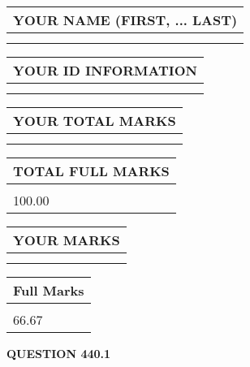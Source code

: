 \documentclass{ctexart}
\begin{document}
   
   
   
\newpage 
\setcounter{page}{ 
   440001 } 
   
   
   
   
\noindent\begin{tabular}{|l|}
\hline
YOUR NAME (FIRST, ... LAST)  \\
\hline
 \\ 
 \\ 
\hline
\end{tabular}
\hspace{0.05in} \begin{tabular}{|l|}
\hline
 YOUR   ID   INFORMATION  \\
\hline
 \\ 
 \\ 
\hline
\end{tabular}
   
   
\vspace{0.2in}\noindent\begin{tabular}{|l|}
\hline
YOUR TOTAL MARKS  \\
\hline
 \\ 
 \\ 
\hline
\end{tabular}
\hspace{0.05in} \begin{tabular}{|l|}
\hline
TOTAL FULL MARKS  \\
\hline
 \\ 
100.00 \\
\hline
\end{tabular}
   
   
 \vspace{0.2in}
 
 
 
 
   
   
  
\vspace{0.2in}
  
\noindent\begin{tabular}{|l|}
\hline
 YOUR MARKS  \\
\hline
 \\ 
 \\ 
\hline
\end{tabular}
\hspace{0.05in} \begin{tabular}{|l|}
\hline
 Full Marks  \\
\hline
 \\ 
66.67 \\
\hline
\end{tabular}
{\textbf{\Large{QUESTION
440.1 
}}}
  
\end{document}
